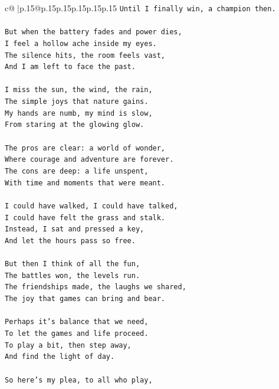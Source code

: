 \documentclass{article}
\begin{document}
{\begin{supertabular}{c@{$\;$}|p{.15\linewidth}@{}p{.15\linewidth}p{.15\linewidth}p{.15\linewidth}p{.15\linewidth}p{.15\linewidth}}
{{{\texttt{Until I finally win, a champion then.  } \\
\\ 
\texttt{But when the battery fades and power dies,  } \\
\texttt{I feel a hollow ache inside my eyes.  } \\
\texttt{The silence hits, the room feels vast,  } \\
\texttt{And I am left to face the past.  } \\
\\ 
\texttt{I miss the sun, the wind, the rain,  } \\
\texttt{The simple joys that nature gains.  } \\
\texttt{My hands are numb, my mind is slow,  } \\
\texttt{From staring at the glowing glow.  } \\
\\ 
\texttt{The pros are clear: a world of wonder,  } \\
\texttt{Where courage and adventure are forever.  } \\
\texttt{The cons are deep: a life unspent,  } \\
\texttt{With time and moments that were meant.  } \\
\\ 
\texttt{I could have walked, I could have talked,  } \\
\texttt{I could have felt the grass and stalk.  } \\
\texttt{Instead, I sat and pressed a key,  } \\
\texttt{And let the hours pass so free.  } \\
\\ 
\texttt{But then I think of all the fun,  } \\
\texttt{The battles won, the levels run.  } \\
\texttt{The friendships made, the laughs we shared,  } \\
\texttt{The joy that games can bring and bear.  } \\
\\ 
\texttt{Perhaps it's balance that we need,  } \\
\texttt{To let the games and life proceed.  } \\
\texttt{To play a bit, then step away,  } \\
\texttt{And find the light of day.  } \\
\\ 
\texttt{So here's my plea, to all who play,  } \\
}}}
\end{supertabular}}
\end{document}
